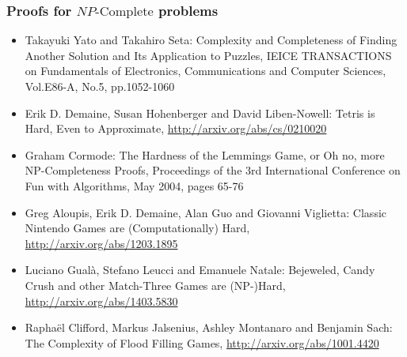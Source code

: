 \documentclass[aspectratio=169]{beamer}
\begin{document}
\begin{frame}
\frametitle{Proofs for $NP\text{-Complete}$ problems}
\begin{itemize}
	\item Takayuki Yato and Takahiro Seta: Complexity and Completeness of Finding Another Solution and Its Application to Puzzles, IEICE TRANSACTIONS on Fundamentals of Electronics, Communications and Computer Sciences, Vol.E86-A, No.5, pp.1052-1060
	\item  Erik D. Demaine, Susan Hohenberger and David Liben-Nowell: Tetris is Hard, Even to Approximate, \url{http://arxiv.org/abs/cs/0210020}
    \item Graham Cormode: The Hardness of the Lemmings Game, or Oh no, more NP-Completeness Proofs, Proceedings of the 3rd International Conference on Fun with Algorithms, May 2004, pages 65-76
    \item Greg Aloupis, Erik D. Demaine, Alan Guo and Giovanni Viglietta: Classic Nintendo Games are (Computationally) Hard, \url{http://arxiv.org/abs/1203.1895}
    \item Luciano Gualà, Stefano Leucci and Emanuele Natale: Bejeweled, Candy Crush and other Match-Three Games are (NP-)Hard, \url{http://arxiv.org/abs/1403.5830}
    \item Rapha\"{e}l Clifford, Markus Jalsenius, Ashley Montanaro and Benjamin Sach:  The Complexity of Flood Filling Games, \url{http://arxiv.org/abs/1001.4420}
\end{itemize}
\end{frame}

\end{document}
